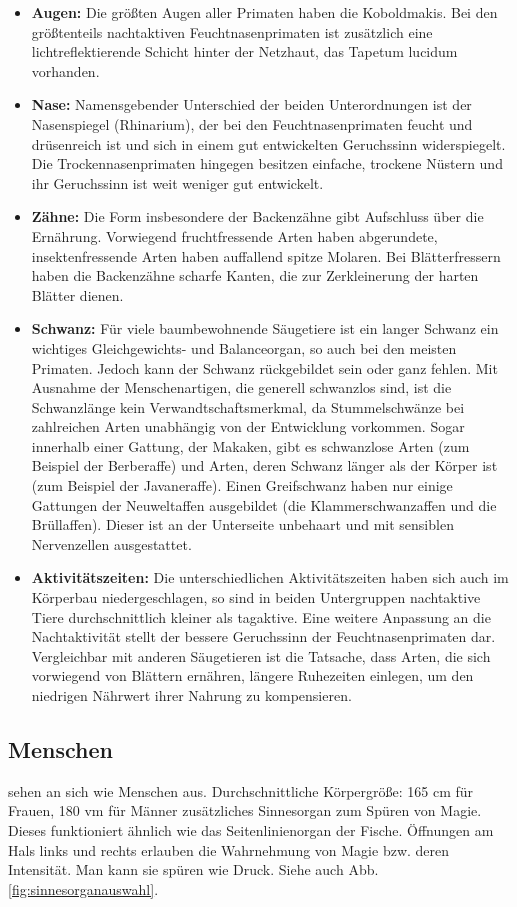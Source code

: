 \begin{itemize}
	\item \textbf{Augen:} Die größten Augen aller Primaten haben die Koboldmakis. Bei den größtenteils nachtaktiven Feuchtnasenprimaten ist zusätzlich eine lichtreflektierende Schicht hinter der Netzhaut, das Tapetum lucidum vorhanden.
	\item \textbf{Nase:} Namensgebender Unterschied der beiden Unterordnungen ist der Nasenspiegel (Rhinarium), der bei den Feuchtnasenprimaten feucht und drüsenreich ist und sich in einem gut entwickelten Geruchssinn widerspiegelt. Die Trockennasenprimaten hingegen besitzen einfache, trockene Nüstern und ihr Geruchssinn ist weit weniger gut entwickelt. 
	\item \textbf{Zähne:} Die Form insbesondere der Backenzähne gibt Aufschluss über die Ernährung. Vorwiegend fruchtfressende Arten haben abgerundete, insektenfressende Arten haben auffallend spitze Molaren. Bei Blätterfressern haben die Backenzähne scharfe Kanten, die zur Zerkleinerung der harten Blätter dienen. 
	\item \textbf{Schwanz:} Für viele baumbewohnende Säugetiere ist ein langer Schwanz ein wichtiges Gleichgewichts- und Balanceorgan, so auch bei den meisten Primaten. Jedoch kann der Schwanz rückgebildet sein oder ganz fehlen. Mit Ausnahme der Menschenartigen, die generell schwanzlos sind, ist die Schwanzlänge kein Verwandtschaftsmerkmal, da Stummelschwänze bei zahlreichen Arten unabhängig von der Entwicklung vorkommen. Sogar innerhalb einer Gattung, der Makaken, gibt es schwanzlose Arten (zum Beispiel der Berberaffe) und Arten, deren Schwanz länger als der Körper ist (zum Beispiel der Javaneraffe). Einen Greifschwanz haben nur einige Gattungen der Neuweltaffen ausgebildet (die Klammerschwanzaffen und die Brüllaffen). Dieser ist an der Unterseite unbehaart und mit sensiblen Nervenzellen ausgestattet.
	\item \textbf{Aktivitätszeiten:} Die unterschiedlichen Aktivitätszeiten haben sich auch im Körperbau niedergeschlagen, so sind in beiden Untergruppen nachtaktive Tiere durchschnittlich kleiner als tagaktive. Eine weitere Anpassung an die Nachtaktivität stellt der bessere Geruchssinn der Feuchtnasenprimaten dar. Vergleichbar mit anderen Säugetieren ist die Tatsache, dass Arten, die sich vorwiegend von Blättern ernähren, längere Ruhezeiten einlegen, um den niedrigen Nährwert ihrer Nahrung zu kompensieren. 
\end{itemize}


\subsection{Menschen} \label{rasse:mensch}
\begin{outline}
	\1 sehen an sich wie Menschen aus. Durchschnittliche Körpergröße: 165 cm für Frauen, 180 vm für Männer
	\1 zusätzliches Sinnesorgan zum Spüren von Magie. Dieses funktioniert ähnlich wie das Seitenlinienorgan der Fische. Öffnungen am Hals links und rechts erlauben die Wahrnehmung von Magie bzw. deren Intensität. Man kann sie spüren wie Druck. Siehe auch Abb. \ref{fig:sinnesorganauswahl}.
\end{outline}


